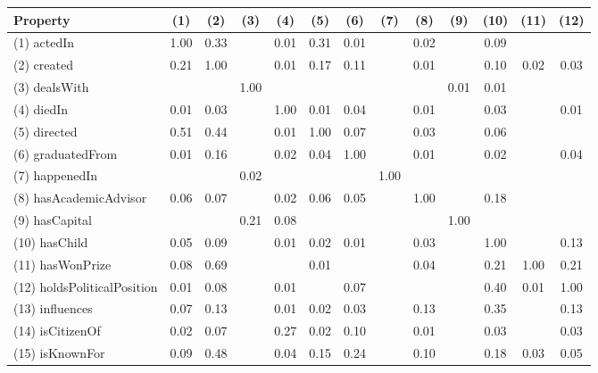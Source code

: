 \begin{table}[t]
    \begin{center}
        \scriptsize
        \begin{tabular}{|l||*{12}{c}|}
            \hline
       Property & (1) & (2) & (3) & (4) & (5) & (6) & (7) & (8) & (9) & (10) & (11) & (12) \\
            \hline
            (1) actedIn  & 1.00  & 0.33  &    & 0.01  & 0.31  & 0.01  &    & 0.02  &    & 0.09  &    &   \\
            (2) created  & 0.21  & 1.00  &    & 0.01  & 0.17  & 0.11  &    & 0.01  &    & 0.10  & 0.02  & 0.03 \\
            (3) dealsWith  &    &    & 1.00  &    &    &    &    &    & 0.01  & 0.01  &    &   \\
            (4) diedIn  & 0.01  & 0.03  &    & 1.00  & 0.01  & 0.04  &    & 0.01  &    & 0.03  &    & 0.01 \\
            (5) directed  & 0.51  & 0.44  &    & 0.01  & 1.00  & 0.07  &    & 0.03  &    & 0.06  &    &   \\
            (6) graduatedFrom  & 0.01  & 0.16  &    & 0.02  & 0.04  & 1.00  &    & 0.01  &    & 0.02  &    & 0.04 \\
            (7) happenedIn  &    &    & 0.02  &    &    &    & 1.00  &    &    &    &    &   \\
            (8) hasAcademicAdvisor  & 0.06  & 0.07  &    & 0.02  & 0.06  & 0.05  &    & 1.00  &    & 0.18  &    &   \\
            (9) hasCapital  &    &    & 0.21  & 0.08  &    &    &    &    & 1.00  &    &    &   \\
            (10) hasChild  & 0.05  & 0.09  &    & 0.01  & 0.02  & 0.01  &    & 0.03  &    & 1.00  &    & 0.13 \\
            (11) hasWonPrize  & 0.08  & 0.69  &    &    & 0.01  &    &    & 0.04  &    & 0.21  & 1.00  & 0.21 \\
            (12) holdsPoliticalPosition  & 0.01  & 0.08  &    & 0.01  &    & 0.07  &    &    &    & 0.40  & 0.01  & 1.00 \\
            (13) influences  & 0.07  & 0.13  &    & 0.01  & 0.02  & 0.03  &    & 0.13  &    & 0.35  &    & 0.13 \\
            (14) isCitizenOf  & 0.02  & 0.07  &    & 0.27  & 0.02  & 0.10  &    & 0.01  &    & 0.03  &    & 0.03 \\
            (15) isKnownFor  & 0.09  & 0.48  &    & 0.04  & 0.15  & 0.24  &    & 0.10  &    & 0.18  & 0.03  & 0.05 \\

\end{tabular}
\end{center}
\end{table}
